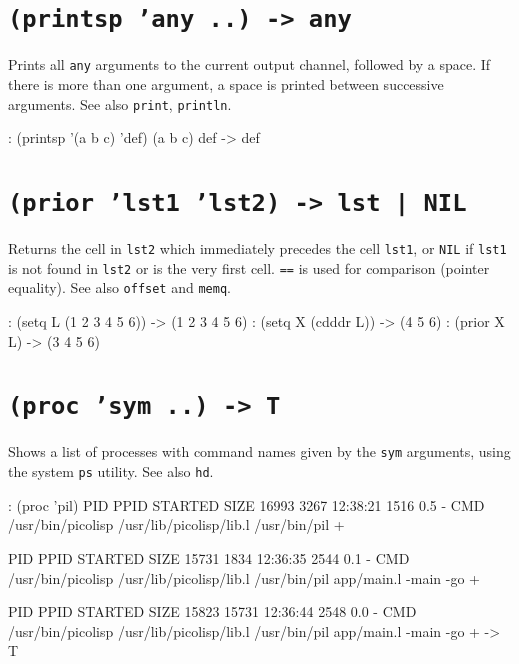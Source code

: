  
\section*{\texttt{(printsp 'any ..) -> any}}
\label{sec:func-ref-P-(printsp 'any ..) -> any}


Prints all \texttt{any} arguments to the current output channel, followed by a
space. If there is more than one argument, a space is printed between
successive arguments. See also \texttt{print}, \texttt{println}.


\begin{wideverbatim}
: (printsp '(a b c) 'def)
(a b c) def -> def
\end{wideverbatim}

 
\section*{\texttt{(prior 'lst1 'lst2) -> lst | NIL}}
\label{sec:func-ref-P-(prior 'lst1 'lst2) -> lst | NIL}


Returns the cell in \texttt{lst2} which immediately precedes the cell \texttt{lst1},
or \texttt{NIL} if \texttt{lst1} is not found in \texttt{lst2} or is the very first cell.
\texttt{==} is used for comparison (pointer equality). See also \texttt{offset} and
\texttt{memq}.


\begin{wideverbatim}
: (setq L (1 2 3 4 5 6))
-> (1 2 3 4 5 6)
: (setq X (cdddr L))
-> (4 5 6)
: (prior X L)
-> (3 4 5 6)
\end{wideverbatim}

 
\section*{\texttt{(proc 'sym ..) -> T}}
\label{sec:func-ref-P-(proc 'sym ..) -> T}


Shows a list of processes with command names given by the \texttt{sym}
arguments, using the system \texttt{ps} utility. See also \texttt{hd}.


\begin{wideverbatim}
: (proc 'pil)
  PID    PPID  STARTED  SIZE %
  16993  3267 12:38:21  1516  0.5  -
  CMD
  /usr/bin/picolisp /usr/lib/picolisp/lib.l /usr/bin/pil +

  PID    PPID  STARTED  SIZE %
  15731  1834 12:36:35  2544  0.1  -
  CMD
  /usr/bin/picolisp /usr/lib/picolisp/lib.l /usr/bin/pil app/main.l -main -go +

  PID    PPID  STARTED  SIZE %
  15823 15731 12:36:44  2548  0.0  -
  CMD
  /usr/bin/picolisp /usr/lib/picolisp/lib.l /usr/bin/pil app/main.l -main -go +
-> T
\end{wideverbatim}

